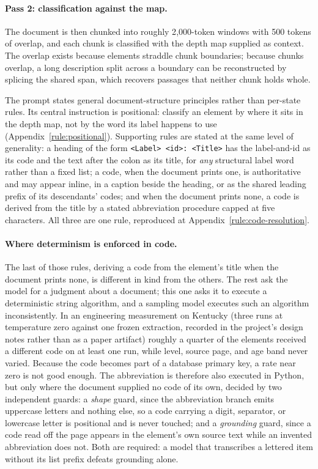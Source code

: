 \paragraph{Pass 2: classification against the map.} The document is then chunked
into roughly 2{,}000-token windows with 500 tokens of overlap, and each chunk is
classified with the depth map supplied as context. The overlap exists because
elements straddle chunk boundaries; because chunks overlap, a long description
split across a boundary can be reconstructed by splicing the shared span, which
recovers passages that neither chunk holds whole.

The prompt states general document-structure principles rather than per-state
rules. Its central instruction is positional: classify an element by where it
sits in the depth map, not by the word its label happens to use
(Appendix~\ref{rule:positional}). Supporting
rules are stated at the same level of generality: a heading of the form
\texttt{<Label> <id>: <Title>} has the label-and-id as its code and the text
after the colon as its title, for \emph{any} structural label word rather than a
fixed list; a code, when the document prints one, is authoritative and may
appear inline, in a caption beside the heading, or as the shared leading prefix
of its descendants' codes; and when the document prints none, a code is
derived from the title by a stated abbreviation procedure capped at five
characters. All three are one rule, reproduced at
Appendix~\ref{rule:code-resolution}.

\paragraph{Where determinism is enforced in code.} The last of those rules,
deriving a code from the element's title when the document prints none, is
different in kind from the others. The rest ask the model for a judgment about
a document; this one asks it to execute a deterministic string algorithm, and a
sampling model executes such an algorithm inconsistently. In an engineering
measurement on Kentucky (three runs at temperature zero against one frozen
  extraction, recorded in the project's design notes rather than as a paper
artifact) roughly a quarter of the elements received a different code on at
least one run, while level, source page, and age band never varied. Because the
code becomes part of a database primary key, a rate near zero is not good
enough. The abbreviation is therefore also executed in Python, but only where
the document supplied no code of its own, decided by two independent guards: a
\emph{shape} guard, since the abbreviation branch emits uppercase letters and
nothing else, so a code carrying a digit, separator, or lowercase letter is
positional and is never touched; and a \emph{grounding} guard, since a code read
off the page appears in the element's own source text while an invented
abbreviation does not. Both are required: a model that transcribes a lettered
item without its list prefix defeats grounding alone.

